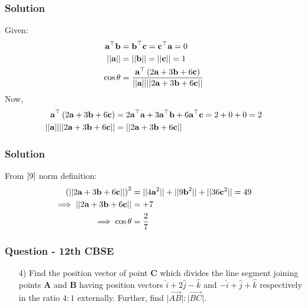 \documentclass{beamer}
\begin{document}
\begin{frame}
\frametitle{Solution}
Given:
\begin{align}
    \textbf{a}^{\top}\textbf{b} &=  \textbf{b}^{\top}\textbf{c} =  \textbf{c}^{\top}\textbf{a} = 0\\
    \lvert \lvert \textbf{a} \rvert \rvert 
&= \lvert \lvert \textbf{b} \rvert \rvert = \lvert \lvert \textbf{c} \rvert \rvert = 1\\
\cos{\theta} &= \frac{\textbf{a}^{\top}\left(2\textbf{a}+3\textbf{b}+6\textbf{c}\right)}{\lvert \lvert \textbf{a} \rvert \rvert \lvert \lvert 2\textbf{a} + 3\textbf{b} + 6\textbf{c} \rvert \rvert}
\end{align}
Now,
\begin{align}
    \textbf{a}^{\top}\left(2\textbf{a}+3\textbf{b}+6\textbf{c}\right) &= 2\textbf{a}^{\top}\textbf{a} + 3\textbf{a}^{\top}\textbf{b} + 6\textbf{a}^{\top}\textbf{c} = 2 + 0 + 0 = 2\\
    \lvert \lvert \textbf{a} \rvert \rvert \lvert \lvert 2\textbf{a} + 3\textbf{b} + 6\textbf{c} \rvert \rvert &= \lvert \lvert 2\textbf{a} + 3\textbf{b} + 6\textbf{c} \rvert \rvert
    \end{align}
\end{frame}









\begin{frame}
\frametitle{Solution}
From $\eqref{9}$ norm definition:
    \begin{align}
        \left(\lvert \lvert 2\textbf{a} + 3\textbf{b} + 6\textbf{c} \rvert \rvert\right)^2 &= \lvert \lvert 4\textbf{a}^2 \rvert \rvert + \lvert \lvert 9\textbf{b}^2 \rvert \rvert + \lvert \lvert 36\textbf{c}^2  \rvert \rvert = 49\\
    \implies \lvert \lvert 2\textbf{a} + 3\textbf{b} + 6\textbf{c} \rvert \rvert &= +7\\
    \implies \cos{\theta} &= \dfrac{2}{7}
\end{align}
    
\end{frame}







\begin{frame}
\frametitle{Question - 12th CBSE}
\begin{enumerate}
    \item [4)]
Find the position vector of point $\textbf{C}$ which divides the line segment joining points $\textbf{A}$ and $\textbf{B}$ having position vectors $\hat{i} + 2\hat{j} - \hat{k}$ and $-\hat{i} + \hat{j} + \hat{k}$ respectively in the ratio $4:1$ externally. Further, find $\lvert \overrightarrow{AB}\rvert : \lvert \overrightarrow{BC} \rvert$. 
    \end{enumerate}
\end{frame}
\end{document}

